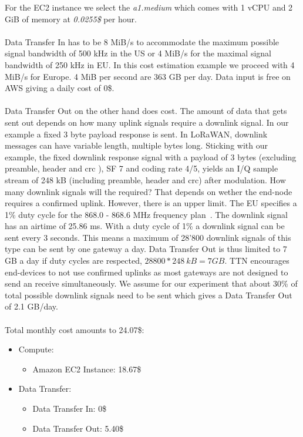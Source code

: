 For the EC2 instance we select the \emph{a1.medium} which comes with 1 vCPU and 2 GiB of memory at \emph{0.0255\$} per hour.
\\
\\
Data Transfer In has to be 8 MiB/s to accommodate the maximum possible signal bandwidth of 500 kHz in the US or 
4 MiB/s for the maximal signal bandwidth of 250 kHz in EU. In this cost estimation example we proceed with 4 MiB/s for Europe.
4 MiB per second are 363 GB per day. Data input is free on AWS giving a daily cost of 0\$.
\\
\\
Data Transfer Out on the other hand does cost. The amount of data that gets sent out depends on
how many uplink signals require a downlink signal. In our example a fixed 3 byte payload response is sent.
In LoRaWAN, downlink messages can have variable length, multiple bytes long.
Sticking with our example, the fixed downlink response signal with a payload of 3 bytes (excluding preamble, header and crc ), SF 7 and coding rate 4/5,
yields an I/Q sample stream of 248 kB (including preamble, header and crc) after modulation.
How many downlink signals will the required? That depends on wether the end-node requires a confirmed uplink.
However, there is an upper limit. The EU specifies a 1\% duty cycle for the 868.0 - 868.6 MHz frequency plan~\cite{duty_cycle}.
The downlink signal has an airtime of 25.86 ms. With a duty cycle of 1\% a downlink signal can be sent every 3 seconds.
This means a maximum of 28'800 downlink signals of this type can be sent by one gateway a day.
Data Transfer Out is thus limited to 7 GB a day if duty cycles are respected, $28800 * 248~kB = 7 GB$.
TTN encourages end-devices to not use confirmed uplinks as most gateways are not designed to send an receive
simultaneously. We assume for our experiment that about 30\% of total possible downlink signals need to be sent
which gives a Data Transfer Out of 2.1 GB/day.
\\
\\
Total monthly cost amounts to 24.07\$:
\begin{itemize}
    \item Compute:
    \begin{itemize}
        \item  Amazon EC2 Instance: 18.67\$
    \end{itemize}
    \item  Data Transfer:
    \begin{itemize}
        \item Data Transfer In: 0\$
        \item Data Transfer Out: 5.40\$  
    \end{itemize}
\end{itemize}

